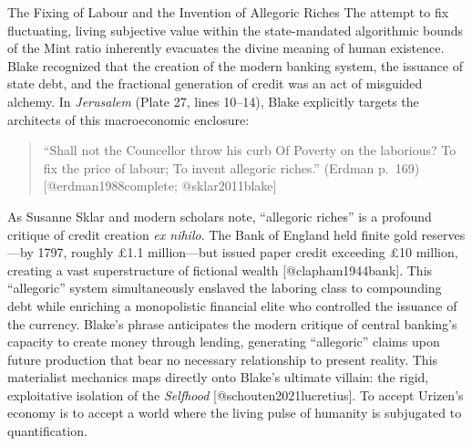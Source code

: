 \documentclass[
  ignorenonframetext,
]{beamer}
\begin{document}
\begin{frame}{The Fixing of Labour and the Invention of Allegoric
Riches}
\protect{}\label{sec-allegoric-riches}
The attempt to fix fluctuating, living subjective value within the
state-mandated algorithmic bounds of the Mint ratio inherently evacuates
the divine meaning of human existence. Blake recognized that the
creation of the modern banking system, the issuance of state debt, and
the fractional generation of credit was an act of misguided alchemy. In
\emph{Jerusalem} (Plate 27, lines 10--14), Blake explicitly targets the
architects of this macroeconomic enclosure:

\begin{quote}
``Shall not the Councellor throw his curb Of Poverty on the laborious?
To fix the price of labour; To invent allegoric riches.'' (Erdman
p.~169) {[}@erdman1988complete; @sklar2011blake{]}
\end{quote}

As Susanne Sklar and modern scholars note, ``allegoric riches'' is a
profound critique of credit creation \emph{ex nihilo}. The Bank of
England held finite gold reserves---by 1797, roughly £1.1 million---but
issued paper credit exceeding £10 million, creating a vast
superstructure of fictional wealth {[}@clapham1944bank{]}. This
``allegoric'' system simultaneously enslaved the laboring class to
compounding debt while enriching a monopolistic financial elite who
controlled the issuance of the currency. Blake's phrase anticipates the
modern critique of central banking's capacity to create money through
lending, generating ``allegoric'' claims upon future production that
bear no necessary relationship to present reality. This materialist
mechanics maps directly onto Blake's ultimate villain: the rigid,
exploitative isolation of the \emph{Selfhood}
{[}@schouten2021lucretius{]}. To accept Urizen's economy is to accept a
world where the living pulse of humanity is subjugated to
quantification.
\end{frame}
\end{document}
